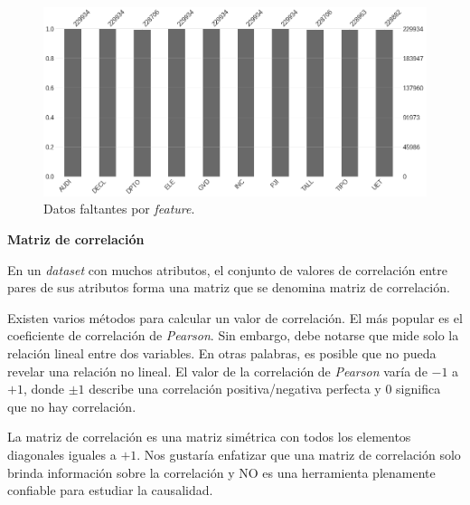 \documentclass[a4paper,12pt]{article}
\begin{document}
		\begin{figure}[H]
			\begin{center}
				\includegraphics[width=1\textwidth]{tesis_66.png}
				\caption{Datos faltantes por \textit{feature}.}
				\label{fig:missingvalue}
			\end{center}
		\end{figure}
		
		\textbf{Matriz de correlación}
		
		En un \textit{dataset} con muchos atributos, el conjunto de valores de correlación entre pares de sus atributos forma una matriz que se denomina matriz de correlación.
		
		Existen varios métodos para calcular un valor de correlación. El más popular es el coeficiente de correlación de \textit{Pearson}. Sin embargo, debe notarse que mide solo la relación lineal entre dos variables. En otras palabras, es posible que no pueda revelar una relación no lineal. El valor de la correlación de \textit{Pearson} varía de $-1$ a $+1$, donde $\pm1$ describe una correlación positiva/negativa perfecta y $0$ significa que no hay correlación. \citep{corrmatrix}
		
		La matriz de correlación es una matriz simétrica con todos los elementos diagonales iguales a $+1$. Nos gustaría enfatizar que una matriz de correlación solo brinda información sobre la correlación y NO es una herramienta plenamente confiable para estudiar la causalidad. 
		
\end{document}
